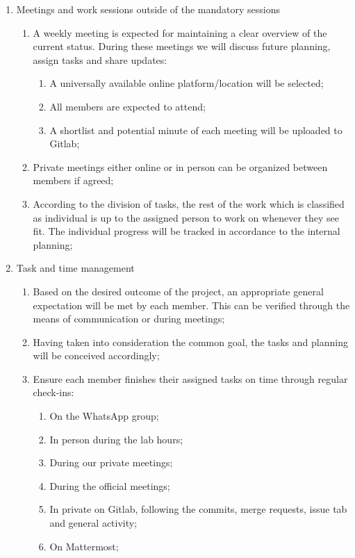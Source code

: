 \begin{enumerate}
    \item Meetings and work sessions outside of the mandatory sessions
    \begin{enumerate}
    \item A weekly meeting is expected for maintaining a clear overview of the current status. During these meetings we will discuss future planning, assign tasks and share updates:
    \begin{enumerate}
        \item A universally available online platform/location will be selected;
        \item All members are expected to attend;
        \item A shortlist and potential minute of each meeting will be uploaded to Gitlab;
    \end{enumerate}
    \item Private meetings either online or in person can be organized between members if agreed;
    \item According to the division of tasks, the rest of the work which is classified as individual is up to the assigned person to work on whenever they see fit. The individual progress will be tracked in accordance to the internal planning;
    \end{enumerate}
    \item Task and time management
    \begin{enumerate}
    \item Based on the desired outcome of the project, an appropriate general expectation will be met by each member. This can be verified through the means of communication or during meetings;
    \item Having taken into consideration the common goal, the tasks and planning will be conceived accordingly;
    \item Ensure each member finishes their assigned tasks on time through regular check-ins:
    \begin{enumerate}
        \item On the WhatsApp group;
        \item In person during the lab hours;
        \item During our private meetings;
        \item During the official meetings;
        \item In private on Gitlab, following the commits, merge requests, issue tab and general activity;
        \item On Mattermost;

\end{enumerate}
\end{enumerate}
\end{enumerate}
